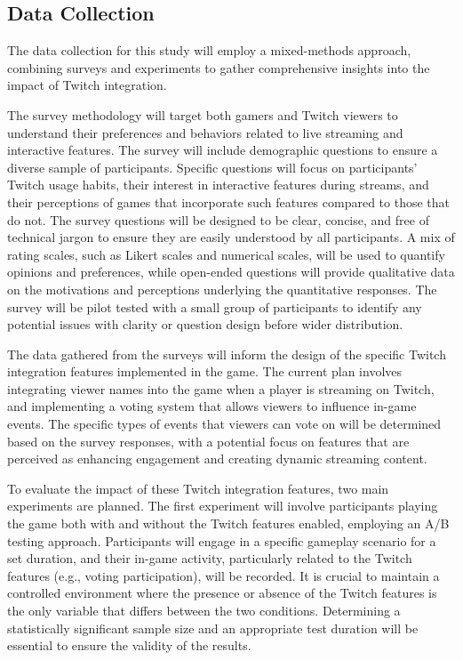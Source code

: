 \documentclass[conference]{IEEEtran}
\begin{document}
\subsection{Data Collection}
The data collection for this study will employ a mixed-methods approach, combining surveys and experiments to gather comprehensive insights into the impact of Twitch integration.

The survey methodology will target both gamers and Twitch viewers to understand their preferences and behaviors related to live streaming and interactive features. The survey will include demographic questions to ensure a diverse sample of participants. Specific questions will focus on participants' Twitch usage habits, their interest in interactive features during streams, and their perceptions of games that incorporate such features compared to those that do not. The survey questions will be designed to be clear, concise, and free of technical jargon to ensure they are easily understood by all participants. A mix of rating scales, such as Likert scales and numerical scales, will be used to quantify opinions and preferences, while open-ended questions will provide qualitative data on the motivations and perceptions underlying the quantitative responses. The survey will be pilot tested with a small group of participants to identify any potential issues with clarity or question design before wider distribution.

The data gathered from the surveys will inform the design of the specific Twitch integration features implemented in the game. The current plan involves integrating viewer names into the game when a player is streaming on Twitch, and implementing a voting system that allows viewers to influence in-game events. The specific types of events that viewers can vote on will be determined based on the survey responses, with a potential focus on features that are perceived as enhancing engagement and creating dynamic streaming content.

To evaluate the impact of these Twitch integration features, two main experiments are planned. The first experiment will involve participants playing the game both with and without the Twitch features enabled, employing an A/B testing approach. Participants will engage in a specific gameplay scenario for a set duration, and their in-game activity, particularly related to the Twitch features (e.g., voting participation), will be recorded. It is crucial to maintain a controlled environment where the presence or absence of the Twitch features is the only variable that differs between the two conditions. Determining a statistically significant sample size and an appropriate test duration will be essential to ensure the validity of the results.
\end{document}
